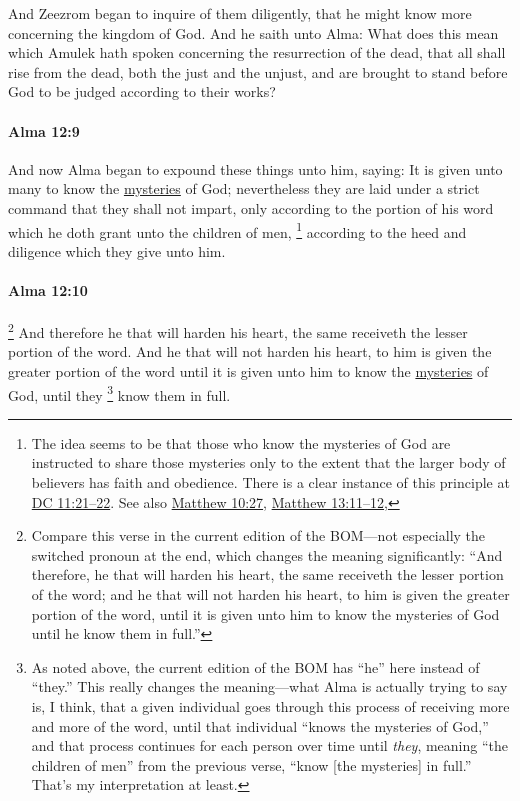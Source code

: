 			And Zeezrom began to inquire of them diligently,
			that he might know more concerning the kingdom of God.
			And he saith unto Alma:
			What does this mean which Amulek hath spoken
			concerning the resurrection of the dead,
			that all shall rise from the dead,
			both the just and the unjust,
			and are brought to stand before God
			to be judged according to their works?

		\paragraph{Alma 12:9} %
			\label{ALMA-12-9}
		
			And now Alma began to expound these things unto him, saying:
			It is given unto many to know the \hyperref[MYSTERY]{mysteries} of God;
			nevertheless they are laid under a strict command
			that they shall not impart,
			only according to the portion of his word
			which he doth grant unto the children of men,%
				\footnote{%
					The idea seems to be that those who know the mysteries of God are instructed to share those mysteries only to the extent that the larger body of believers has faith and obedience. There is a clear instance of this principle at \hyperref[DC11-21]{DC 11:21--22}. See also \hyperref[MATTHEW-10-27]{Matthew 10:27}, \hyperref[MATTHEW-13-11]{Matthew 13:11--12},
					}
			according to the heed and diligence which they give unto him.
	
		\paragraph{Alma 12:10} %
			\label{ALMA-12-10}
			
			\footnote{%
				Compare this verse in the current edition of the BOM---not especially the switched pronoun at the end, which changes the meaning significantly: ``And therefore, he that will harden his heart, the same receiveth the lesser portion of the word; and he that will not harden his heart, to him is given the greater portion of the word, until it is given unto him to know the mysteries of God until he know them in full.''
				}%
			And therefore he that will harden his heart,
			the same receiveth the lesser portion of the word.
			And he that will not harden his heart,
			to him is given the greater portion of the word
			until it is given unto him to know the \hyperref[MYSTERY]{mysteries} of God,
			until they%
				\footnote{%
					As noted above, the current edition of the BOM has ``he'' here instead of ``they.'' This really changes the meaning---what Alma is actually trying to say is, I think, that a given individual goes through this process of receiving more and more of the word, until that individual ``knows the mysteries of God,'' and that process continues for each person over time until \textit{they}, meaning ``the children of men'' from the previous verse, ``know [the mysteries] in full.'' That's my interpretation at least.
					}
			know them in full.
			
